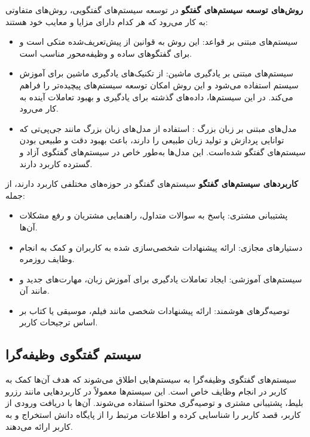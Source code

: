 \textbf{روش‌های توسعه سیستم‌های گفتگو}\newline
در توسعه سیستم‌های گفتگویی، روش‌های متفاوتی به کار می‌رود که هر کدام دارای مزایا و معایب خود هستند:

\begin{itemize}
\item
سیستم‌های مبتنی بر قواعد: این روش به قوانین از پیش‌تعریف‌شده متکی است و برای گفتگوهای ساده و وظیفه‌محور مناسب است.
\item
سیستم‌های مبتنی بر یادگیری ماشین: از تکنیک‌های یادگیری ماشین برای آموزش سیستم استفاده می‌شود و این روش امکان توسعه سیستم‌های پیچیده‌تر را فراهم می‌کند. در این سیستم‌ها، داده‌های گذشته برای یادگیری و بهبود تعاملات آینده به کار می‌رود.
\item
مدل‌های مبتنی بر زبان بزرگ%
: استفاده از مدل‌های زبان بزرگ مانند جی‌پی‌تی که توانایی پردازش و تولید زبان طبیعی را دارند، باعث بهبود دقت و طبیعی بودن سیستم‌های گفتگو شده‌است. این مدل‌ها به‌طور خاص در سیستم‌های گفتگوی آزاد و گسترده کاربرد دارند.

\end{itemize}

\textbf{کاربردهای سیستم‌های گفتگو}\newline
سیستم‌های گفتگو در حوزه‌های مختلفی کاربرد دارند، از جمله:
\begin{itemize}
\item
پشتیبانی مشتری: پاسخ به سوالات متداول، راهنمایی مشتریان و رفع مشکلات آن‌ها.
\item
دستیارهای مجازی: ارائه پیشنهادات شخصی‌سازی شده به کاربران و کمک به انجام وظایف روزمره.
\item
سیستم‌های آموزشی: ایجاد تعاملات یادگیری برای آموزش زبان، مهارت‌های جدید و مانند آن.
\item
توصیه‌گرهای هوشمند: ارائه پیشنهادات شخصی مانند فیلم، موسیقی یا کتاب بر اساس ترجیحات کاربر.
\end{itemize}

\subsection{سیستم گفتگوی وظیفه‌گرا}
سیستم‌های گفتگوی وظیفه‌گرا%
 به سیستم‌هایی اطلاق می‌شوند که هدف آن‌ها کمک به کاربر در انجام وظایف خاص است. این سیستم‌ها معمولاً در کاربردهایی مانند رزرو بلیط، پشتیبانی مشتری و توصیه‌گری محتوا استفاده می‌شوند. آن‌ها با دریافت ورودی از کاربر، قصد کاربر را شناسایی کرده و اطلاعات مرتبط را از پایگاه دانش استخراج و به کاربر ارائه می‌دهند.

